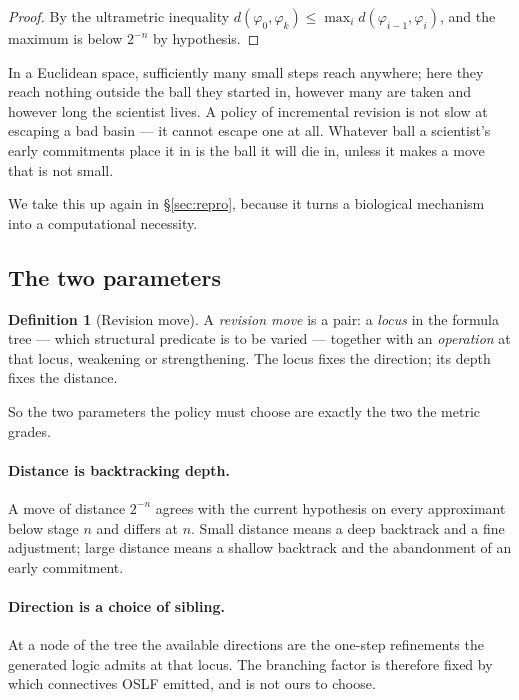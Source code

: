 \documentclass[11pt]{article}
\theoremstyle{plain}
\theoremstyle{definition}
\newtheorem{definition}[theorem]{Definition}
\begin{document}
\begin{proof}
By the ultrametric inequality $d(\varphi_0, \varphi_k) \le \max_i d(\varphi_{i-1}, \varphi_i)$, and
the maximum is below $2^{-n}$ by hypothesis.
\end{proof}

In a Euclidean space, sufficiently many small steps reach anywhere; here they reach nothing outside the
ball they started in, however many are taken and however long the scientist lives. A policy of
incremental revision is not slow at escaping a bad basin --- it cannot escape one at all. Whatever ball
a scientist's early commitments place it in is the ball it will die in, unless it makes a move that is
not small.

We take this up again in \S\ref{sec:repro}, because it turns a biological mechanism into a
computational necessity.

\subsection{The two parameters}

\begin{definition}[Revision move]
\label{def:move}
A \emph{revision move} is a pair: a \emph{locus} in the formula tree --- which structural predicate is
to be varied --- together with an \emph{operation} at that locus, weakening or strengthening. The
locus fixes the direction; its depth fixes the distance.
\end{definition}

So the two parameters the policy must choose are exactly the two the metric grades.

\paragraph{Distance is backtracking depth.} A move of distance $2^{-n}$ agrees with the current
hypothesis on every approximant below stage $n$ and differs at $n$. Small distance means a deep
backtrack and a fine adjustment; large distance means a shallow backtrack and the abandonment of an
early commitment.

\paragraph{Direction is a choice of sibling.} At a node of the tree the available directions are the
one-step refinements the generated logic admits at that locus. The branching factor is therefore fixed
by which connectives OSLF emitted, and is not ours to choose.
\end{document}

